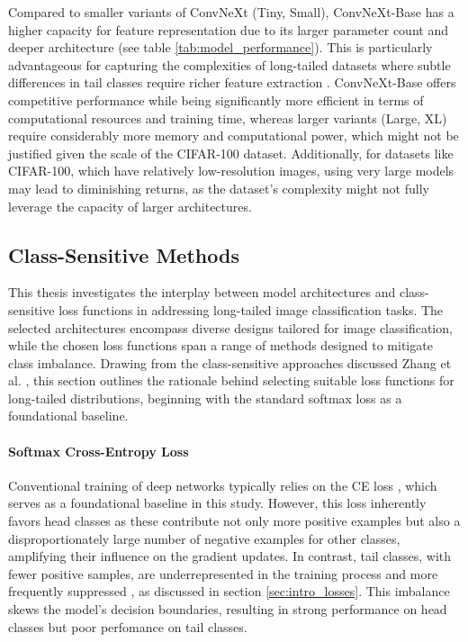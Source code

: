 Compared to smaller variants of ConvNeXt (Tiny, Small), ConvNeXt-Base has a higher capacity for feature representation due to its larger parameter count and deeper architecture (see table \ref{tab:model_performance}). This is particularly advantageous for capturing the complexities of long-tailed datasets where subtle differences in tail classes require richer feature extraction \cite{liu2022convnet2020s}. ConvNeXt-Base offers competitive performance while being significantly more efficient in terms of computational resources and training time, whereas larger variants (Large, XL) require considerably more memory and computational power, which might not be justified given the scale of the CIFAR-100 dataset. Additionally, for datasets like CIFAR-100, which have relatively low-resolution images, using very large models may lead to diminishing returns, as the dataset's complexity might not fully leverage the capacity of larger architectures.


\subsection{Class-Sensitive Methods}
\label{sec:loss_selection}
This thesis investigates the interplay between model architectures and class-sensitive loss functions in addressing long-tailed image classification tasks. The selected architectures encompass diverse designs tailored for image classification, while the chosen loss functions span a range of methods designed to mitigate class imbalance. Drawing from the class-sensitive approaches discussed Zhang et al. \cite{zhang2023deep}, this section outlines the rationale behind selecting suitable loss functions for long-tailed distributions, beginning with the standard softmax loss as a foundational baseline.

\paragraph{Softmax Cross-Entropy Loss}

Conventional training of deep networks typically relies on the CE loss \cite{zhang2023deep}, which serves as a foundational baseline in this study. However, this loss inherently favors head classes as these contribute not only more positive examples but also a disproportionately large number of negative examples for other classes, amplifying their influence on the gradient updates. In contrast, tail classes, with fewer positive samples, are underrepresented in the training process and more frequently suppressed \cite{zhang2023deep, lin2018focallossdenseobject}, as discussed in section \ref{sec:intro_losses}. This imbalance skews the model's decision boundaries, resulting in strong performance on head classes but poor perfomance on tail classes.

